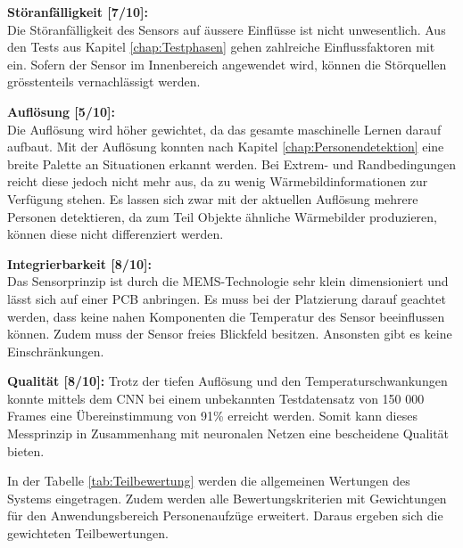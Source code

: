 \textbf{Störanfälligkeit [7/10]:} \\
Die Störanfälligkeit des Sensors auf äussere Einflüsse ist nicht unwesentlich. Aus den Tests aus Kapitel \ref{chap:Testphasen} gehen zahlreiche Einflussfaktoren mit ein. Sofern der Sensor im Innenbereich angewendet wird, können die Störquellen grösstenteils vernachlässigt werden.

\textbf{Auflösung [5/10]:} \\
Die Auflösung wird höher gewichtet, da das gesamte maschinelle Lernen darauf aufbaut. Mit der Auflösung konnten nach Kapitel \ref{chap:Personendetektion} eine breite Palette an Situationen erkannt werden. Bei Extrem- und Randbedingungen reicht diese jedoch nicht mehr aus, da zu wenig Wärmebildinformationen zur Verfügung stehen. Es lassen sich zwar mit der aktuellen Auflösung mehrere Personen detektieren, da zum Teil Objekte ähnliche Wärmebilder produzieren, können diese nicht differenziert werden.  

\textbf{Integrierbarkeit [8/10]:} \\
Das Sensorprinzip ist durch die MEMS-Technologie sehr klein dimensioniert und lässt sich auf einer \ac{PCB} anbringen. Es muss bei der Platzierung darauf geachtet werden, dass keine nahen Komponenten die Temperatur des Sensor beeinflussen können. Zudem muss der Sensor freies Blickfeld besitzen. Ansonsten gibt es keine Einschränkungen. 

\textbf{Qualität [8/10]:}
Trotz der tiefen Auflösung und den Temperaturschwankungen konnte mittels dem \ac{CNN} bei einem unbekannten Testdatensatz von 150 000 Frames eine Übereinstimmung von 91\% erreicht werden. Somit kann dieses Messprinzip in Zusammenhang mit neuronalen Netzen eine bescheidene Qualität bieten.

In der Tabelle \ref{tab:Teilbewertung} werden die allgemeinen Wertungen des Systems eingetragen. Zudem werden alle Bewertungskriterien mit Gewichtungen für den Anwendungsbereich Personenaufzüge erweitert. Daraus ergeben sich die gewichteten Teilbewertungen.

